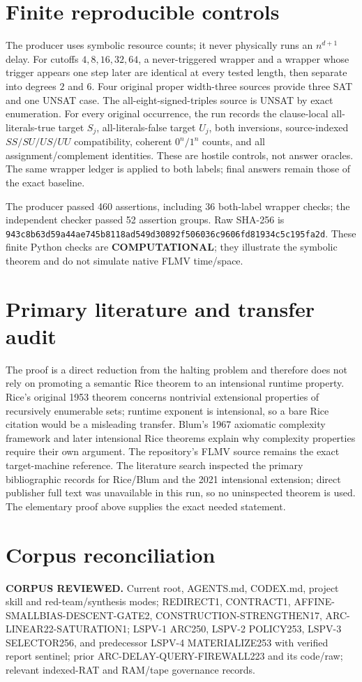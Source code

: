 \documentclass[11pt]{article}
\begin{document}
\section{Finite reproducible controls}
The producer uses symbolic resource counts; it never physically runs an $n^{d+1}$ delay. For cutoffs $4,8,16,32,64$, a never-triggered wrapper and a wrapper whose trigger appears one step later are identical at every tested length, then separate into degrees $2$ and $6$. Four original proper width-three sources provide three SAT and one UNSAT case. The all-eight-signed-triples source is UNSAT by exact enumeration. For every original occurrence, the run records the clause-local all-literals-true target $S_j$, all-literals-false target $U_j$, both inversions, source-indexed $SS/SU/US/UU$ compatibility, coherent $0^n/1^n$ counts, and all assignment/complement identities. These are hostile controls, not answer oracles. The same wrapper ledger is applied to both labels; final answers remain those of the exact baseline.

The producer passed 460 assertions, including 36 both-label wrapper checks; the independent checker passed 52 assertion groups. Raw SHA-256 is
\texttt{943c8b63d59a44ae745b8118ad549d30892f506036c9606fd81934c5c195fa2d}.
These finite Python checks are \textbf{COMPUTATIONAL}; they illustrate the symbolic theorem and do not simulate native FLMV time/space.

\section{Primary literature and transfer audit}
The proof is a direct reduction from the halting problem and therefore does not rely on promoting a semantic Rice theorem to an intensional runtime property. Rice's original 1953 theorem concerns nontrivial extensional properties of recursively enumerable sets; runtime exponent is intensional, so a bare Rice citation would be a misleading transfer. Blum's 1967 axiomatic complexity framework and later intensional Rice theorems explain why complexity properties require their own argument. The repository's FLMV source remains the exact target-machine reference. The literature search inspected the primary bibliographic records for Rice/Blum and the 2021 intensional extension; direct publisher full text was unavailable in this run, so no uninspected theorem is used. The elementary proof above supplies the exact needed statement.

\section{Corpus reconciliation}
\textbf{CORPUS REVIEWED.} Current root, AGENTS.md, CODEX.md, project skill and red-team/synthesis modes; REDIRECT1, CONTRACT1, AFFINE-SMALLBIAS-DESCENT-GATE2, CONSTRUCTION-STRENGTHEN17, ARC-LINEAR22-SATURATION1; LSPV-1 ARC250, LSPV-2 POLICY253, LSPV-3 SELECTOR256, and predecessor LSPV-4 MATERIALIZE253 with verified report sentinel; prior ARC-DELAY-QUERY-FIREWALL223 and its code/raw; relevant indexed-RAT and RAM/tape governance records.
\end{document}
